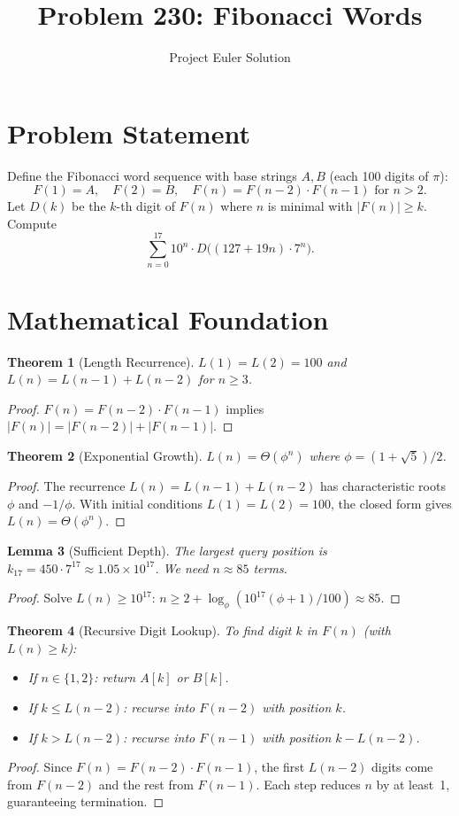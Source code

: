 \documentclass[12pt]{article}
\title{Problem 230: Fibonacci Words}
\author{Project Euler Solution}
\date{}
\newtheorem{theorem}{Theorem}
\newtheorem{lemma}[theorem]{Lemma}
\begin{document}
\maketitle

\section{Problem Statement}
Define the Fibonacci word sequence with base strings $A, B$ (each 100 digits of $\pi$):
\[
F(1) = A, \quad F(2) = B, \quad F(n) = F(n-2) \cdot F(n-1) \text{ for } n > 2.
\]
Let $D(k)$ be the $k$-th digit of $F(n)$ where $n$ is minimal with $|F(n)| \geq k$. Compute
\[
\sum_{n=0}^{17} 10^n \cdot D\bigl((127 + 19n) \cdot 7^n\bigr).
\]

\section{Mathematical Foundation}

\begin{theorem}[Length Recurrence]
$L(1) = L(2) = 100$ and $L(n) = L(n-1) + L(n-2)$ for $n \geq 3$.
\end{theorem}
\begin{proof}
$F(n) = F(n-2) \cdot F(n-1)$ implies $|F(n)| = |F(n-2)| + |F(n-1)|$.
\end{proof}

\begin{theorem}[Exponential Growth]
$L(n) = \Theta(\phi^n)$ where $\phi = (1+\sqrt{5})/2$.
\end{theorem}
\begin{proof}
The recurrence $L(n) = L(n-1) + L(n-2)$ has characteristic roots $\phi$ and $-1/\phi$. With initial conditions $L(1) = L(2) = 100$, the closed form gives $L(n) = \Theta(\phi^n)$.
\end{proof}

\begin{lemma}[Sufficient Depth]
The largest query position is $k_{17} = 450 \cdot 7^{17} \approx 1.05 \times 10^{17}$. We need $n \approx 85$ terms.
\end{lemma}
\begin{proof}
Solve $L(n) \geq 10^{17}$: $n \geq 2 + \log_\phi(10^{17}(\phi+1)/100) \approx 85$.
\end{proof}

\begin{theorem}[Recursive Digit Lookup]
To find digit $k$ in $F(n)$ (with $L(n) \geq k$):
\begin{itemize}
\item If $n \in \{1, 2\}$: return $A[k]$ or $B[k]$.
\item If $k \leq L(n-2)$: recurse into $F(n-2)$ with position $k$.
\item If $k > L(n-2)$: recurse into $F(n-1)$ with position $k - L(n-2)$.
\end{itemize}
\end{theorem}
\begin{proof}
Since $F(n) = F(n-2) \cdot F(n-1)$, the first $L(n-2)$ digits come from $F(n-2)$ and the rest from $F(n-1)$. Each step reduces $n$ by at least~1, guaranteeing termination.
\end{proof}
\end{document}
